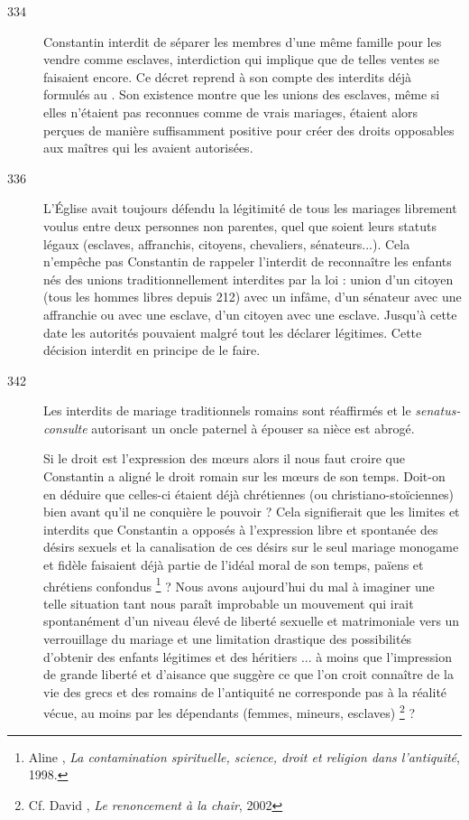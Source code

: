 \begin{description}
\item[334] Constantin interdit de séparer les membres d'une même famille pour les vendre comme esclaves, interdiction qui implique que de telles ventes se faisaient encore. Ce décret reprend à son compte des interdits déjà formulés au . Son existence montre que les unions des esclaves, même si elles n'étaient pas reconnues comme de vrais mariages, étaient alors perçues de manière suffisamment positive pour créer des droits opposables aux maîtres qui les avaient autorisées. 

\item[336] L'Église avait toujours défendu la légitimité de tous les mariages librement voulus entre deux personnes non parentes, quel que soient leurs statuts légaux (esclaves, affranchis, citoyens, chevaliers, sénateurs...). Cela n'empêche pas Constantin de rappeler l'interdit de reconnaître les enfants nés des unions traditionnellement interdites par la loi : union d'un citoyen (tous les hommes libres depuis 212) avec un infâme, d'un sénateur avec une affranchie ou avec une esclave, d'un citoyen avec une esclave. Jusqu'à cette date les autorités pouvaient malgré tout les déclarer légitimes. Cette décision interdit en principe de le faire. 

\item[342] Les interdits de mariage traditionnels romains sont réaffirmés et le \emph{senatus-consulte} autorisant un oncle paternel à épouser sa nièce est abrogé.

 Si le droit est l'expression des mœurs alors il nous faut croire que Constantin a aligné le droit romain sur les mœurs de son temps. Doit-on en déduire que celles-ci étaient déjà chrétiennes (ou christiano-stoïciennes) bien avant qu'il ne conquière le pouvoir ? Cela signifierait que les limites et interdits que Constantin a opposés à l'expression libre et spontanée des désirs sexuels et la canalisation de ces désirs sur le seul mariage monogame et fidèle faisaient déjà partie de l'idéal moral de son temps, païens et chrétiens confondus%
\footnote{Aline , \emph{La contamination spirituelle, science, droit et religion dans l'antiquité}, 1998.} 
 ? Nous avons aujourd'hui du mal à imaginer une telle situation tant nous paraît improbable un mouvement qui irait spontanément d'un niveau élevé de liberté sexuelle et matrimoniale vers un verrouillage du mariage et une limitation drastique des possibilités d'obtenir des enfants légitimes et des héritiers ... à moins que l'impression de grande liberté et d'aisance que suggère ce que l'on croit connaître de la vie des grecs et des romains de l'antiquité ne corresponde pas à la réalité vécue, au moins par les dépendants (femmes, mineurs, esclaves)%
\footnote{Cf. David , \emph{Le renoncement à la chair}, 2002} 
 ? 


\end{description}
